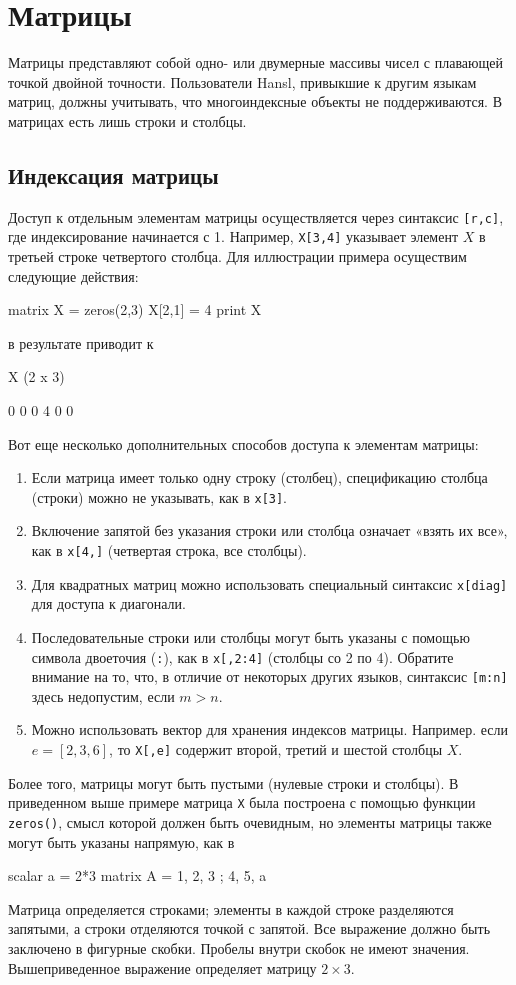 \chapter{Матрицы}
\label{chap:matrices}

Матрицы представляют собой одно- или двумерные массивы чисел с
плавающей точкой двойной точности. Пользователи Hansl, привыкшие к
другим языкам матриц, должны учитывать, что многоиндексные объекты не
поддерживаются. В матрицах есть лишь строки и столбцы.

\section{Индексация матрицы}
\label{sec:mat-index}

Доступ к отдельным элементам матрицы осуществляется через синтаксис
\verb|[r,c]|, где индексирование начинается с 1. Например,
\texttt{X[3,4]} указывает элемент $X$ в третьей строке четвертого
столбца. Для иллюстрации примера осуществим следующие действия:
\begin{code}
  matrix X = zeros(2,3)
  X[2,1] = 4
  print X
\end{code}
в результате приводит к 
\begin{code}
X (2 x 3)

  0   0   0 
  4   0   0 
\end{code}

Вот еще несколько дополнительных способов доступа к элементам матрицы:
\begin{enumerate}
\item Если матрица имеет только одну строку (столбец), спецификацию
  столбца (строки) можно не указывать, как в \texttt{x[3]}.
\item Включение запятой без указания строки или столбца означает
  «взять их все», как в \texttt{x[4,]} (четвертая строка, все
  столбцы).
\item Для квадратных матриц можно использовать специальный синтаксис
  \texttt{x[diag]} для доступа к диагонали.
\item Последовательные строки или столбцы могут быть указаны с помощью
  символа двоеточия (\texttt{:}), как в \texttt{x[,2:4]} (столбцы со 2
  по 4).  Обратите внимание на то, что, в отличие от некоторых других
  языков, синтаксис \texttt{[m:n]} здесь недопустим, если $m>n$.
\item Можно использовать вектор для хранения индексов
  матрицы. Например. если $e = [2,3,6]$, то \texttt{X[,e]} содержит
  второй, третий и шестой столбцы $X$.
\end{enumerate}
Более того, матрицы могут быть пустыми (нулевые строки и столбцы).  В
приведенном выше примере матрица \texttt{X} была построена с помощью
функции \texttt{zeros()}, смысл которой должен быть очевидным, но
элементы матрицы также могут быть указаны напрямую, как в
\begin{code}
scalar a = 2*3
matrix A = { 1, 2, 3 ; 4, 5, a }
\end{code}
Матрица определяется строками; элементы в каждой строке разделяются
запятыми, а строки отделяются точкой с запятой. Все выражение должно
быть заключено в фигурные скобки. Пробелы внутри скобок не имеют
значения. Вышеприведенное выражение определяет матрицу $2\times3$.

